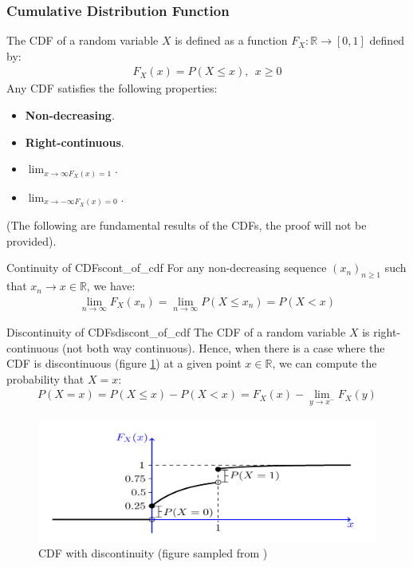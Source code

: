 \subsubsection{Cumulative Distribution Function}
\begin{definition}
    The CDF of a random variable $X$ is defined as a function $F_X:\mathbb{R} \to [0,1]$ defined by:
    \begin{align*}
        F_X(x) = P(X \le x), \ \ x \ge 0
    \end{align*}
    \noindent Any CDF satisfies the following properties:
    \begin{itemize}
        \item \textbf{Non-decreasing}.
        \item \textbf{Right-continuous}.
        \item \textbf{$\lim_{x\to\infty F_X(x) = 1}$}.
        \item \textbf{$\lim_{x\to-\infty F_X(x) = 0}$}.
    \end{itemize}
\end{definition}

\noindent (The following are fundamental results of the CDFs, the proof will not be provided).
\begin{proposition}{Continuity of CDFs}{cont_of_cdf}
    For any non-decreasing sequence $(x_n)_{n\ge 1}$ such that $x_n \to x\in\mathbb{R}$, we have:
    \begin{align*}
        \lim_{n\to\infty}F_X(x_n) = \lim_{n\to\infty} P(X \le x_n) = P(X < x)
    \end{align*}
\end{proposition}

\begin{proposition}{Discontinuity of CDFs}{discont_of_cdf}
    The CDF of a random variable $X$ is right-continuous (not both way continuous). Hence, when there is a case where the CDF is discontinuous (figure \ref{fig:cdf-with-discont}) at a given point $x\in\mathbb{R}$, we can compute the probability that $X=x$:
    \begin{align*}
        P(X=x) = P(X\le x) - P(X < x) = F_X(x) - \lim_{y\to x^-}F_X(y)
    \end{align*}
\end{proposition}

\begin{figure}[ht]
    \centering
    \includegraphics[width=\textwidth]{figures/cdf_with_discont.png}
    \caption{CDF with discontinuity (figure sampled from \cite{book:privault})}
    \label{fig:cdf-with-discont}
\end{figure}

